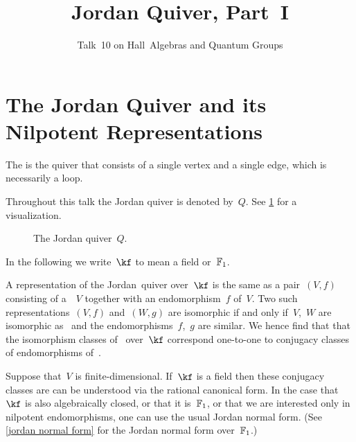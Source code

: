 \documentclass[a4paper,11pt]{scrartcl}
\title{Jordan Quiver, Part~I}
\subtitle{Talk~10 on Hall~Algebras and Quantum Groups}
\author{}
\date{}
\begin{document}
\maketitle

\vspace{-4em}





\section{The Jordan Quiver and its Nilpotent Representations}

\begin{definition}
  The  is the quiver that consists of a single vertex and a single edge, which is necessarily a loop.
\end{definition}

Throughout this talk the Jordan quiver is denoted by~$Q$.
See \cref{jordan quiver} for a visualization.
\begin{figure}[tb]
  \centering
  \caption{The Jordan quiver~$Q$.}
  \label{jordan quiver}
\end{figure}
In the following we write~$\kf$ to mean a field or~$\mathbb{F}_1$.

A representation of the Jordan~quiver over~$\kf$ is the same as a pair~$(V,f)$ consisting of a~\vectorspace{$\kf$}~$V$ together with an endomorphism~$f$ of~$V$.
Two such representations~$(V, f)$ and~$(W, g)$ are isomorphic if and only if~$V$,~$W$ are isomorphic as~\vectorspaces{$\kf$} and the endomorphisms~$f$,~$g$ are similar.
We hence find that that the isomorphism classes of~ over~$\kf$ correspond one-to-one to conjugacy classes of endomorphisms of~\vectorspaces{$\kf$}.

Suppose that~$V$ is finite-dimensional.
If~$\kf$ is a field then these conjugacy classes are can be understood via the rational canonical form.
In the case that~$\kf$ is also algebraically closed, or that it is~$\mathbb{F}_1$, or that we are interested only in nilpotent endomorphisms, one can use the usual Jordan normal form.
(See \cref{jordan normal form} for the Jordan normal form over~$\mathbb{F}_1$.)
\end{document}
